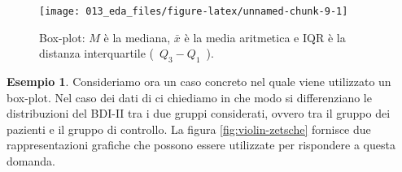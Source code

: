 \documentclass[
  10pt,
  italian,
  a4paper,
  extrafontsizes,onecolumn,openright
  ]{memoir}
\newenvironment{Shaded}{\begin{snugshade}}{\end{snugshade}}
\newcommand{\AttributeTok}[1]{\textcolor[rgb]{0.77,0.63,0.00}{#1}}
\newcommand{\ConstantTok}[1]{\textcolor[rgb]{0.00,0.00,0.00}{#1}}
\newcommand{\FunctionTok}[1]{\textcolor[rgb]{0.00,0.00,0.00}{#1}}
\newcommand{\NormalTok}[1]{#1}
\newcommand{\OtherTok}[1]{\textcolor[rgb]{0.56,0.35,0.01}{#1}}
\newcommand{\SpecialCharTok}[1]{\textcolor[rgb]{0.00,0.00,0.00}{#1}}
\newcommand{\StringTok}[1]{\textcolor[rgb]{0.31,0.60,0.02}{#1}}
\theoremstyle{definition}
\theoremstyle{definition}
\newtheorem{example}{Esempio}[chapter]
\theoremstyle{definition}
\theoremstyle{definition}
\theoremstyle{remark}
\begin{document}
\begin{figure}[h]

{\centering \texttt{[image: 013\_eda\_files/figure-latex/unnamed-chunk-9-1]} 

}

\caption{Box-plot: $M$ è la mediana, $\bar{x}$ è la media aritmetica e IQR è la distanza interquartile (~$Q_3 - Q_1$~).}\label{fig:unnamed-chunk-9}
\end{figure}

\begin{example}
Consideriamo ora un caso concreto nel quale viene utilizzato un box-plot.
Nel caso dei dati di \textcite{zetschefuture2019} ci chiediamo in che modo si differenziano le distribuzioni del BDI-II tra i due gruppi considerati, ovvero tra il gruppo dei pazienti e il gruppo di controllo. La figura \ref{fig:violin-zetsche} fornisce due rappresentazioni grafiche che possono essere utilizzate per rispondere a questa domanda.

\begin{Shaded}
\end{Shaded}
\end{example}
\end{document}
